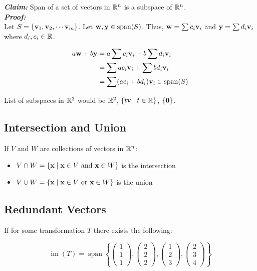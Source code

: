\noindent
\textbf{\textit{Claim:}} Span of a set of vectors in $\mathbb{R}^n$ is a subspace of $\mathbb{R}^n$.\\
\textbf{\textit{Proof:}}\\
Let $S=\{\textbf v_1 ,\textbf v_2 ,\cdots\textbf v_m \}$. Let $\textbf w ,\textbf{y}\in \mathrm{span}(S)$.
Thus, $\textbf w =\sum c_i\textbf v_i$ and $\textbf{y}=\sum d_i\textbf v_i $ where $d_i,c_i\in \mathbb{R}$.

\begin{align*}
    a\textbf w +b\textbf{y}&=a\sum c_i\textbf v_i+b\sum d_i\textbf v_i\\
    &=\sum a c_{i} \textbf v_{i}+\sum b d_{i} \textbf v_i\\
    &=\sum (a c_i+b d_i) \textbf v_i \in \operatorname{span}(S)
\end{align*}

\noindent
List of subspaces in $\mathbb{R}^2$ would be $\mathbb{R}^2$, $\{t\textbf{v}\mid t\in\mathbb{R}\}$, $\{\textbf{0}\}$.

\subsection{Intersection and Union}

If $V$ and $W$ are collections of vectors in $\mathbb{R}^n$:
\begin{itemize}
    \item $V \cap W=\{\textbf{x} \mid \textbf{x} \in V \text { and } \textbf{x} \in W\}$ is the intersection
    \item $V \cup W=\{\textbf{x} \mid \textbf{x} \in V \text { or } \textbf{x} \in W\}$ is the union
\end{itemize}

\subsection{Redundant Vectors}

If for some transformation $T$ there exists the following:

\[\operatorname{im}(T)=\operatorname{span}\left\{\left(\begin{array}{l}
    1 \\
    1 \\
    1
    \end{array}\right),\left(\begin{array}{l}
    2 \\
    2 \\
    2
    \end{array}\right),\left(\begin{array}{l}
    1 \\
    2 \\
    3
    \end{array}\right),\left(\begin{array}{l}
    2 \\
    3 \\
    4
    \end{array}\right)\right\}\]


